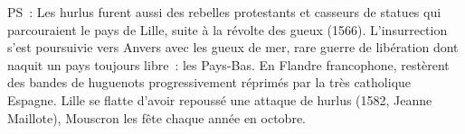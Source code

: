 \documentclass[french,twoside]{book} %
\newif\ifdev
\renewcommand{\LettrineFontHook}{\color{rubric}}
\newcommand{\initialiv}[2]{%
  \let\oldLFH\LettrineFontHook
  \IfSubStr{QJ’}{#1}{
    \lettrine[lines=4, lhang=0.2, loversize=-0.1, lraise=0.2]{\smash{#1}}{#2}
  }{\IfSubStr{É}{#1}{
    \lettrine[lines=4, lhang=0.2, loversize=-0, lraise=0]{\smash{#1}}{#2}
  }{\IfSubStr{ÀÂ}{#1}{
    \lettrine[lines=4, lhang=0.2, loversize=-0, lraise=0, slope=0.6em]{\smash{#1}}{#2}
  }{\IfSubStr{A}{#1}{
    \lettrine[lines=4, lhang=0.2, loversize=0.2, slope=0.6em]{\smash{#1}}{#2}
  }{\IfSubStr{V}{#1}{
    \lettrine[lines=4, lhang=0.2, loversize=0.2, slope=-0.5em]{\smash{#1}}{#2}
  }{
    \lettrine[lines=4, lhang=0.2, loversize=0.2]{\smash{#1}}{#2}
  }}}}}
  \let\LettrineFontHook\oldLFH
}
\renewcommand{\LettrineFontHook}{\bfseries\color{rubric}}
\begin{document}
  \bigskip

  \noindent PS : Les hurlus furent aussi des rebelles protestants et casseurs de statues qui parcouraient le pays de Lille, suite à la révolte des gueux (1566).
  L’insurrection s’est poursuivie vers Anvers avec les gueux de mer, rare guerre de libération dont naquit un pays toujours libre : les Pays-Bas.
  En Flandre francophone, restèrent des bandes de huguenots progressivement réprimés par la très catholique Espagne.
  Lille se flatte d’avoir repoussé une attaque de hurlus (1582, Jeanne Maillote), Mouscron les fête chaque année en octobre.
\fi

\ifdev %
\fontname\font — \textsc{Les règles du jeu}\par
(\hyperref[utopie]{\underline{Lien}})\par
\noindent \initialiv{A}{lors là}\blindtext\par
\noindent \initialiv{À}{ la bonheur des dames}\blindtext\par
\noindent \initialiv{É}{tonnez-le}\blindtext\par
\noindent \initialiv{Q}{ualitativement}\blindtext\par
\noindent \initialiv{V}{aloriser}\blindtext\par
\Blindtext
\phantomsection
\label{utopie}
\Blinddocument
\fi
\end{document}
